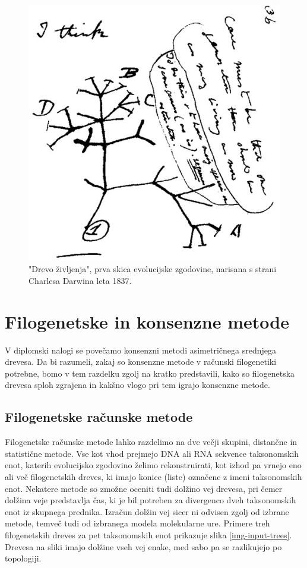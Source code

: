 \documentclass[a4paper, 12pt]{book}
\begin{document}
\begin{figure}
	\begin{center}
		\includegraphics[scale=0.5, clip=true, trim=0 0 0 0]{gfx/darwin_tree.jpg}
	\end{center}
	\caption{"Drevo življenja", prva skica evolucijske zgodovine, narisana s strani Charlesa Darwina leta 1837\cite{cd}.}
	\label{img-darwin-tree}
\end{figure}


\chapter{Filogenetske in konsenzne metode}

V diplomski nalogi se povečamo konsenzni metodi asimetričnega srednjega drevesa. Da bi razumeli, zakaj so konsenzne metode v računski filogenetiki potrebne, bomo v tem razdelku zgolj na kratko predstavili, kako so filogenetska drevesa sploh zgrajena in kakšno vlogo pri tem igrajo konsenzne metode. 

\section{Filogenetske računske metode}

Filogenetske računske metode lahko razdelimo na dve večji skupini, distančne in statistične metode. Vse kot vhod prejmejo DNA ali RNA sekvence taksonomskih enot, katerih evolucijsko zgodovino želimo rekonstruirati, kot izhod pa vrnejo eno ali več filogenetskih dreves, ki imajo konice (liste) označene z imeni taksonomskih enot. Nekatere metode so zmožne oceniti tudi dolžino vej drevesa, pri čemer dolžina veje predstavlja čas, ki je bil potreben za divergenco dveh taksonomskih enot iz skupnega prednika. Izračun dolžin vej sicer ni odvisen zgolj od izbrane metode, temveč tudi od izbranega modela molekularne ure. Primere treh filogenetskih dreves za pet taksonomskih enot prikazuje slika \ref{img-input-trees}. Drevesa na sliki imajo dolžine vseh vej enake, med sabo pa se razlikujejo po topologiji.
\end{document}
